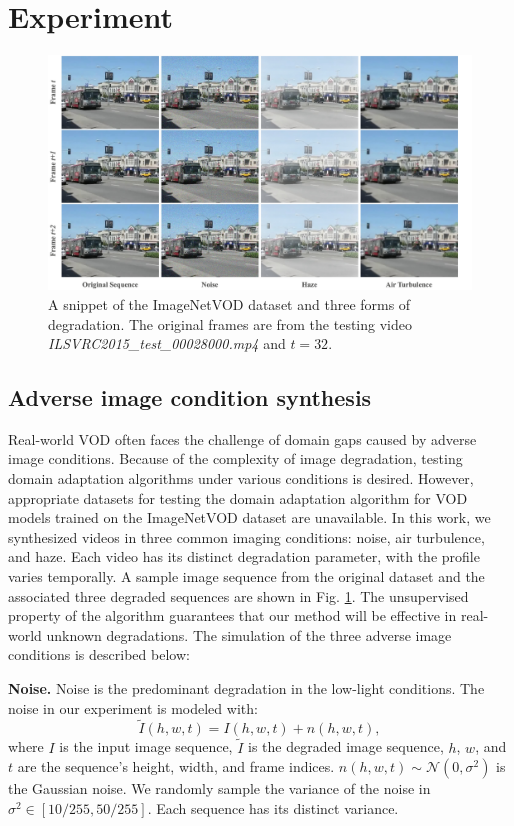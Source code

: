 \section{Experiment}

\begin{figure}
    \centering
    \includegraphics[width = 0.99\linewidth]{figures/test_sample.jpg}
    \caption{A snippet of the ImageNetVOD dataset and three forms of degradation. The original frames are from the testing video \textit{ILSVRC2015\_test\_00028000.mp4} and $t=32$.}
    \label{fig:test_sample}
\end{figure}

\subsection{Adverse image condition synthesis}
\label{synthesis}
Real-world VOD often faces the challenge of domain gaps caused by adverse image conditions. Because of the complexity of image degradation, testing domain adaptation algorithms under various conditions is desired. However, appropriate datasets for testing the domain adaptation algorithm for VOD models trained on the ImageNetVOD dataset are unavailable. In this work, we synthesized videos in three common imaging conditions: noise, air turbulence, and haze. Each video has its distinct degradation parameter, with the profile varies temporally. A sample image sequence from the original dataset and the associated three degraded sequences are shown in Fig. \ref{fig:test_sample}. The unsupervised property of the algorithm guarantees that our method will be effective in real-world unknown degradations. The simulation of the three adverse image conditions is described below:

\noindent \textbf{Noise.} Noise is the predominant degradation in the low-light conditions. The noise in our experiment is modeled with:
\begin{equation}
    \widetilde{I}(h,w,t) = I(h,w,t) + n(h,w,t),
\end{equation}
\noindent where $I$ is the input image sequence, $\widetilde{I}$ is the degraded image sequence, $h$, $w$, and $t$ are the sequence's height, width, and frame indices. $n(h,w,t)\sim \mathcal{N}(0, \sigma^2)$ is the Gaussian noise. We randomly sample the variance of the noise in $\sigma^2\in [10/255, 50/255]$. Each sequence has its distinct variance.

